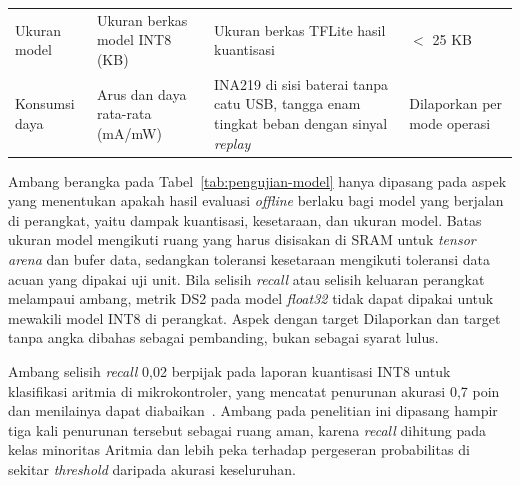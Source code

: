 \begin{center}
\begin{longtable}{>{\RaggedRight\arraybackslash}p{2.5cm}>{\RaggedRight\arraybackslash}p{3.2cm}>{\RaggedRight\arraybackslash}p{4.6cm}>{\RaggedRight\arraybackslash}p{2.5cm}}
    Ukuran model &
    Ukuran berkas model INT8 (KB) &
    Ukuran berkas TFLite hasil kuantisasi &
    $<$ 25 KB \\
    Konsumsi daya &
    Arus dan daya rata-rata (mA/mW) &
    INA219 di sisi baterai tanpa catu USB, tangga enam tingkat beban dengan sinyal \textit{replay} &
    Dilaporkan per mode operasi \\
  \end{longtable}
  \par{}
\end{center}

Ambang berangka pada Tabel~\ref{tab:pengujian-model} hanya dipasang pada aspek yang menentukan apakah hasil evaluasi \textit{offline} berlaku bagi model yang berjalan di perangkat, yaitu dampak kuantisasi, kesetaraan, dan ukuran model. Batas ukuran model mengikuti ruang yang harus disisakan di SRAM untuk \textit{tensor arena} dan bufer data, sedangkan toleransi kesetaraan mengikuti toleransi data acuan yang dipakai uji unit. Bila selisih \textit{recall} atau selisih keluaran perangkat melampaui ambang, metrik DS2 pada model \textit{float32} tidak dapat dipakai untuk mewakili model INT8 di perangkat. Aspek dengan target Dilaporkan dan target tanpa angka dibahas sebagai pembanding, bukan sebagai syarat lulus.

Ambang selisih \textit{recall} 0,02 berpijak pada laporan kuantisasi INT8 untuk klasifikasi aritmia di mikrokontroler, yang mencatat penurunan akurasi 0,7 poin dan menilainya dapat diabaikan~\cite{zambrano_2026}. Ambang pada penelitian ini dipasang hampir tiga kali penurunan tersebut sebagai ruang aman, karena \textit{recall} dihitung pada kelas minoritas Aritmia dan lebih peka terhadap pergeseran probabilitas di sekitar \textit{threshold} daripada akurasi keseluruhan.

